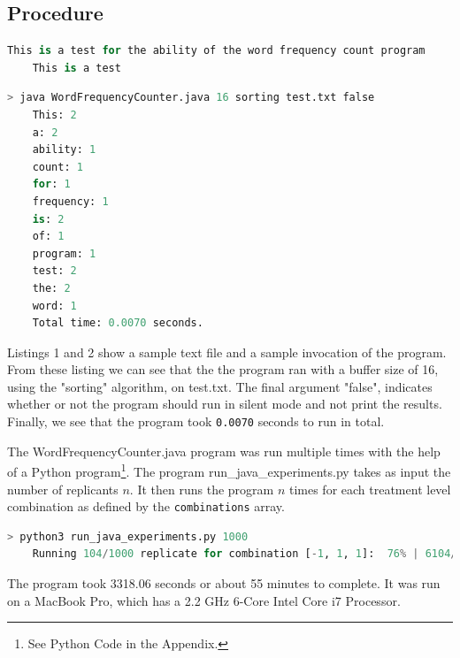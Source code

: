 \documentclass{article}
\begin{document}
\subsection{Procedure}
  \begin{lstlisting}[language=Python, 
    basicstyle=\ttfamily\scriptsize, 
    numbers=none, 
    frame=single,
    showspaces=false,
    caption={A Sample test.txt file.}]
    This is a test for the ability of the word frequency count program
    This is a test
  \end{lstlisting}
\clearpage
  \begin{lstlisting}[language=Python, 
    basicstyle=\ttfamily\scriptsize, 
    numbers=none, 
    frame=single,
    showspaces=false,
    caption={A Sample invocation of the WordFrequencyCounter.java program}]
    > java WordFrequencyCounter.java 16 sorting test.txt false
    This: 2
    a: 2
    ability: 1
    count: 1
    for: 1
    frequency: 1
    is: 2
    of: 1
    program: 1
    test: 2
    the: 2
    word: 1
    Total time: 0.0070 seconds.
  \end{lstlisting}

  Listings 1 and 2 show a sample text file and a sample invocation of the program.
  From these listing we can see that the the program ran with a buffer size of 16,
  using the "sorting" algorithm, on test.txt. The final argument "false",
  indicates whether or not the program should run in silent mode and not print the results.
  Finally, we see that the program took \texttt{0.0070} seconds to run in total.

  The WordFrequencyCounter.java program was run multiple times with the help of a Python program\footnote{See Python Code in the Appendix.}.
  The program run\_java\_experiments.py takes as input the number of replicants $n$.
  It then runs the program $n$ times for each treatment level combination as defined by the \texttt{combinations} array.

  \begin{lstlisting}[language=Python, 
    basicstyle=\ttfamily\scriptsize, 
    numbers=none, 
    frame=single,
    showspaces=false,
    caption={A Sample invocation of the run\_java\_experiments.py program}]
    > python3 run_java_experiments.py 1000
    Running 104/1000 replicate for combination [-1, 1, 1]:  76% | 6104/8000 [1:53:37<31:00,  1.02it/s]
  \end{lstlisting}

  The program took 3318.06 seconds or about 55 minutes to complete. It was run on a MacBook Pro, which has a 2.2 GHz 6-Core Intel Core i7 Processor.
\end{document}
